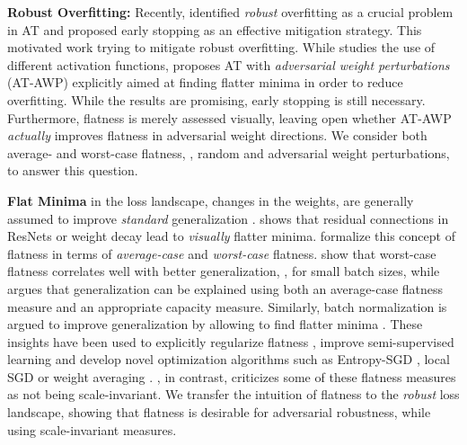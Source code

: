 \textbf{Robust Overfitting:} Recently, \cite{RiceICML2020} identified \emph{robust} overfitting as a crucial problem in AT and proposed early stopping as an effective mitigation strategy. This motivated work \cite{SinglaARXIV2021,WuNIPS2020} trying to mitigate robust overfitting. While \cite{SinglaARXIV2021} studies the use of different activation functions, \cite{WuNIPS2020} proposes AT with \emph{adversarial weight perturbations} (AT-AWP) explicitly aimed at finding flatter minima in order to reduce overfitting. While the results are promising, early stopping is still necessary. Furthermore, flatness is merely assessed visually, leaving open whether AT-AWP \emph{actually} improves flatness in adversarial weight directions. We consider both average- and worst-case flatness, \ie, random and adversarial weight perturbations, to answer this question.

\textbf{Flat Minima} in the loss landscape, \wrt changes in the weights, are generally assumed to improve \emph{standard} generalization \cite{HochreiterNC1997}. \cite{LiNIPS2018} shows that residual connections in ResNets \cite{HeCVPR2016} or weight decay lead to \emph{visually} flatter minima. \cite{NeyshaburNIPS2017,KeskarICLR2017} formalize this concept of flatness in terms of \emph{average-case} and \emph{worst-case} flatness. \cite{KeskarICLR2017,JiangICLR2020} show that worst-case flatness correlates well with better generalization, \eg, for small batch sizes, while \cite{NeyshaburNIPS2017} argues that generalization can be explained using both an average-case flatness measure and an appropriate capacity measure. Similarly, batch normalization is argued to improve generalization by allowing to find flatter minima \cite{SanturkarNIPS2018,BjorckNIPS1018}. These insights have been used to explicitly regularize flatness \cite{ZhengARXIV2020c}, improve semi-supervised learning \cite{CicekICCVWOR2019} and develop novel optimization algorithms such as Entropy-SGD \cite{ChaudhariICLR2017}, local SGD \cite{TinICLR2020} or weight averaging \cite{IzmailovUAI2018}.
\cite{DinhICML2017}, in contrast, criticizes some of these flatness measures as not being scale-invariant.
We transfer the intuition of flatness to the \emph{robust} loss landscape, showing that flatness is desirable for adversarial robustness, while using scale-invariant measures.